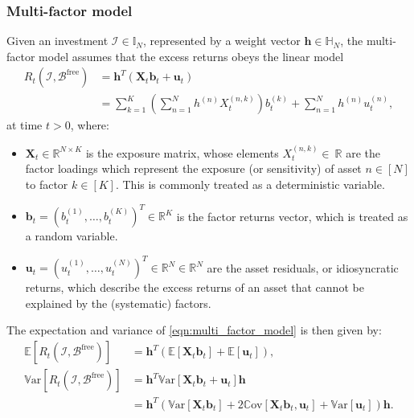 \documentclass[12pt]{article}
\begin{document}
\subsubsection{Multi-factor model} Given an investment $\mathcal{I} \in \mathbb{I}_N$, represented by a weight vector $\mathbf{h} \in \mathbb{H}_N$, the multi-factor model assumes that the excess returns obeys the linear model
\begin{align}
	R_t(\mathcal{I}, \mathcal{B}^{\text{free}}) 
	&= \mathbf{h}^T (\mathbf{X}_t \mathbf{b}_t + \mathbf{u}_t)
	\\
	&= \sum_{k=1}^K \left(\sum_{n=1}^N h^{(n)} X_t^{(n, k)} \right) b_t^{(k)} + \sum_{n=1}^N h^{(n)} u^{(n)}_t,
	\label{eqn:multi_factor_model}
\end{align}
at time $t>0$, where:
\begin{itemize}
	\item $\mathbf{X}_t \in \mathbb{R}^{N \times K}$ is the exposure matrix, whose elements $X_t^{(n, k)} \in\ \mathbb{R}$ are the factor loadings which represent the exposure (or sensitivity) of asset $n \in [N]$ to factor $k \in [K]$. This is commonly treated as a deterministic variable.
	\item $\mathbf{b}_t = (b_t^{(1)}, \dots, b_t^{(K)})^T \in \mathbb{R}^K$ is the factor returns vector, which is treated as a random variable.
	\item $\mathbf{u}_t = (u_t^{(1)}, \dots, u_t^{(N)})^T \in \mathbb{R}^N \in \mathbb{R}^N$ are the asset residuals, or idiosyncratic returns, which describe the excess returns of an asset that cannot be explained by the (systematic) factors.
\end{itemize}
The expectation and variance of \eqref{eqn:multi_factor_model} is then given by:
\begin{align}
	\mathbb{E}[R_t(\mathcal{I}, \mathcal{B}^{\text{free}})] &= \mathbf{h}^T (\mathbb{E}[\mathbf{X}_t \mathbf{b}_t] + \mathbb{E}[\mathbf{u}_t]),
	\\
	\mathbb{V}\text{ar}[R_t(\mathcal{I}, \mathcal{B}^{\text{free}})] 
	&= \mathbf{h}^T \mathbb{V}\text{ar}[\mathbf{X}_t \mathbf{b}_t + \mathbf{u}_t] \mathbf{h}
	\\
	&= \mathbf{h}^T \left(\mathbb{V}\text{ar}[\mathbf{X}_t \mathbf{b}_t] + 2\mathbb{C}\text{ov}[\mathbf{X}_t \mathbf{b}_t, \mathbf{u}_t] + \mathbb{V}\text{ar}[\mathbf{u}_t]\right) \mathbf{h}.
\end{align}
\end{document}
